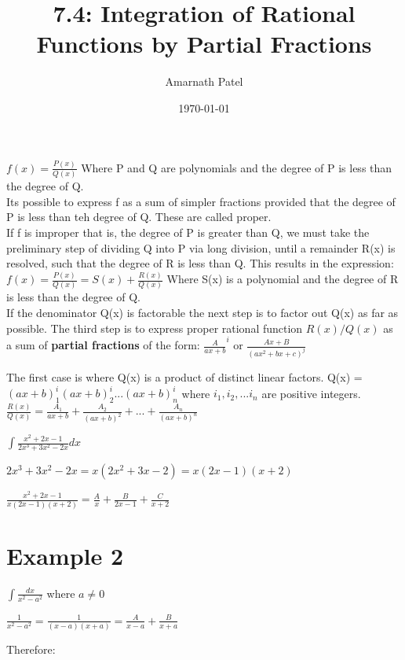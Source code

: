 \documentclass{article}
\title{7.4: Integration of Rational Functions by Partial Fractions}
\author{Amarnath Patel}
\date{\today}
\begin{document}
\maketitle

$f(x) = \frac{P(x)}{Q(x)}$ 
\newline
Where P and Q are polynomials and the degree of P is less than the degree of Q.\\
Its possible to express f as a sum of simpler fractions provided that the degree of P is less than teh degree of Q. These are called proper.\\
If f is improper that is, the degree of P is greater than Q, we must take the preliminary step of dividing Q into P via long division, until a remainder R(x) is resolved, such that the degree of R is less than Q.
This results in the expression:
\newline
\centering
$f(x) = \frac{P(x)}{Q(x)} = S(x) + \frac{R(x)}{Q(x)}$
\newline
\flushleft
Where S(x) is a polynomial and the degree of R is less than the degree of Q.\\

If the denominator Q(x) is factorable the next step is to factor out Q(x) as far as possible. 
The third step is to express proper rational function $R(x)/Q(x)$ as a sum of \textbf{partial fractions} of the form:
$\frac{A}{ax+b}^i$ or $\frac{Ax+B}{(ax^2+bx+c)^j}$

The first case is where Q(x) is a product of distinct linear factors.
Q(x) = $(ax+b)^i_1 (ax+b)^i_2 ... (ax+b)^i_n$ where $i_1, i_2, ... i_n$ are positive integers.\\

$\frac{R(x)}{Q(x)} = \frac{A_1}{ax+b} + \frac{A_2}{(ax+b)^2} + ... + \frac{A_n}{(ax+b)^n}$

$\int \frac{x^2 +2x -1}{2x^3 +3x^2 -2x}dx$

$2x^3 +3x^2 -2x = x(2x^2 +3x -2) = x(2x-1)(x+2)$

$\frac{x^2 +2x-1 }{x(2x-1)(x+2)} = \frac{A}{x} + \frac{B}{2x-1} + \frac{C}{x+2}$

\section{Example 2}

$\int \frac{dx}{x^2-a^2}$ where $a \neq 0$

$\frac{1}{x^2-a^2} = \frac{1}{(x-a)(x+a)} = \frac{A}{x-a} + \frac{B}{x+a}$

Therefore:
\end{document}
